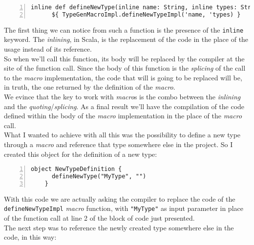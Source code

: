 \begin{minipage}{\linewidth}
  \begin{lstlisting}[numbers=left, numberstyle=\tiny, numbersep=-5pt, stepnumber=1]
    inline def defineNewType(inline name: String, inline types: String*): Any = 
      ${ TypeGenMacroImpl.defineNewTypeImpl('name, 'types) }
  \end{lstlisting}
\end{minipage}
The first thing we can notice from such a function is the presence of the \texttt{inline} keyword.
The \textit{inlining}, in Scala, is the replacement of the code in the place of the usage instead of its reference.\\
So when we'll call this function, its body will be replaced by the compiler at the site of the function call.
Since the body of this function is the \textit{splicing} of the call to the \textit{macro} implementation, the code that will is going to be replaced will be, in truth, the one returned by the definition of the \textit{macro}.\\
We evince that the key to work with \textit{macro}s is the combo between the \textit{inlining} and the \textit{quoting}/\textit{splicing}.
As a final result we'll have the compilation of the code defined within the body of the \textit{macro} implementation in the place of the \textit{macro} call.\\
\newline
What I wanted to achieve with all this was the possibility to define a new type through a \textit{macro} and reference that type somewhere else in the project.
So I created this object for the definition of a new type:\\
\begin{minipage}{\linewidth}
  \begin{lstlisting}[numbers=left, numberstyle=\tiny, numbersep=-5pt, stepnumber=1]
    object NewTypeDefinition {
      defineNewType("MyType", "")
    }
  \end{lstlisting}
\end{minipage}
With this code we are actually asking the compiler to replace the code of the \texttt{defineNewTypeImpl} \textit{macro} function, with \texttt{"MyType"} as input parameter in place of the function call at line 2 of the block of code just presented.\\
The next step was to reference the newly created type somewhere else in the code, in this way:\\
